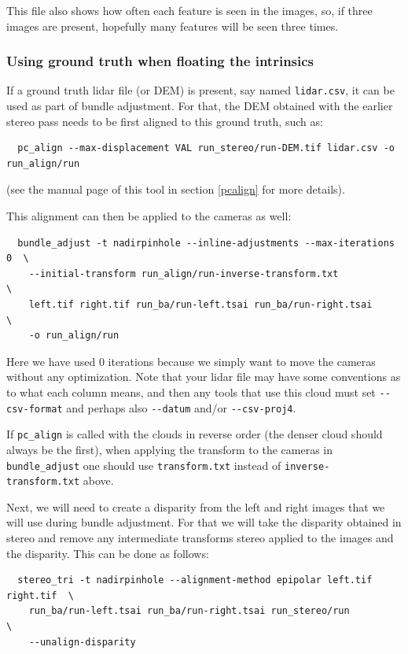 This file also shows how often each feature is seen in the images, so, if three
images are present, hopefully many features will be seen three times. 

\subsubsection{Using ground truth when floating the intrinsics}

If a ground truth lidar file (or DEM) is present, say named \texttt{lidar.csv}, it can be used
as part of bundle adjustment. For that, the DEM obtained with the earlier
stereo pass needs to be first aligned to this ground truth, such as:

\begin{verbatim}
  pc_align --max-displacement VAL run_stereo/run-DEM.tif lidar.csv -o run_align/run 
\end{verbatim}

(see the manual page of this tool in section \ref{pcalign} for more details). 

This alignment can then be applied to the cameras as well:

\begin{verbatim}
  bundle_adjust -t nadirpinhole --inline-adjustments --max-iterations 0  \
    --initial-transform run_align/run-inverse-transform.txt              \
    left.tif right.tif run_ba/run-left.tsai run_ba/run-right.tsai        \
    -o run_align/run
\end{verbatim}

Here we have used 0 iterations because we simply want to move the cameras
without any optimization. Note that your lidar file may have some conventions as to what each column
means, and then any tools that use this cloud must set \texttt{-\/-csv-format}
and perhaps also \texttt{-\/-datum} and/or \texttt{-\/-csv-proj4}. 

If \texttt{pc\_align} is called with the clouds in reverse order
(the denser cloud should always be the first), when applying the
transform to the cameras in \texttt{bundle\_adjust} one should use  
\texttt{transform.txt} instead of \texttt{inverse-transform.txt} above. 

Next, we will need to create a disparity from the left and right images
that we will use during bundle adjustment. For that we will take the disparity obtained
in stereo and remove any intermediate transforms stereo applied to the
images and the disparity. This can be done as follows:

\begin{verbatim}
  stereo_tri -t nadirpinhole --alignment-method epipolar left.tif right.tif  \
    run_ba/run-left.tsai run_ba/run-right.tsai run_stereo/run                \
    --unalign-disparity 
\end{verbatim}

